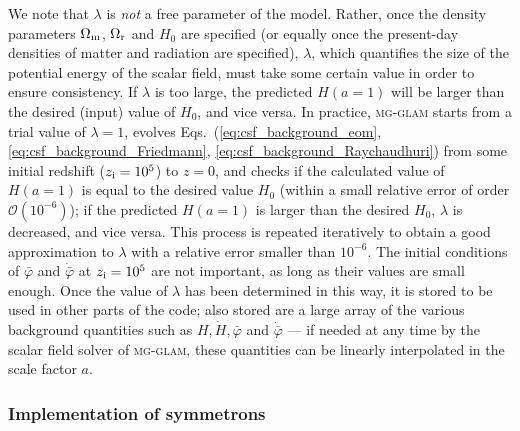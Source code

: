 We note that $\lambda$ is \textit{not} a free parameter of the model. Rather, once the density parameters $\Omega_{\rm m}$, $\Omega_{\rm r}$ and $H_0$ are specified (or equally once the present-day densities of matter and radiation are specified), $\lambda$, which quantifies the size of the potential energy of the scalar field, must take some certain value in order to ensure consistency. If $\lambda$ is too large, the predicted $H(a=1)$ will be larger than the desired (input) value of $H_0$, and vice versa. In practice, \textsc{mg}-\textsc{glam} starts from a trial value of $\lambda=1$, evolves Eqs.~(\ref{eq:csf_background_eom}, \ref{eq:csf_background_Friedmann}, \ref{eq:csf_background_Raychaudhuri}) from some initial redshift ($z_{\rm i}=10^5$) to $z=0$, and checks if the calculated value of $H(a=1)$ is equal to the desired value $H_0$ (within a small relative error of order $\mathcal{O}\left(10^{-6}\right)$); if the predicted $H(a=1)$ is larger than the desired $H_0$, $\lambda$ is decreased, and vice versa. This process is repeated iteratively to obtain a good approximation to $\lambda$ with a relative error smaller than $10^{-6}$. The initial conditions of $\bar{\varphi}$ and $\dot{\bar{\varphi}}$ at $z_{\rm i}=10^5$ are not important, as long as their values are small enough. Once the value of $\lambda$ has been determined in this way, it is stored to be used in other parts of the code; also stored are a large array of the various background quantities such as $H, \dot{H}, \bar{\varphi}$ and $\dot{\bar{\varphi}}$ --- if needed at any time by the scalar field solver of \textsc{mg}-\textsc{glam}, these quantities can be linearly interpolated in the scale factor $a$.  

\subsubsection{Implementation of symmetrons}
\label{subsubsect:sym_imp}

